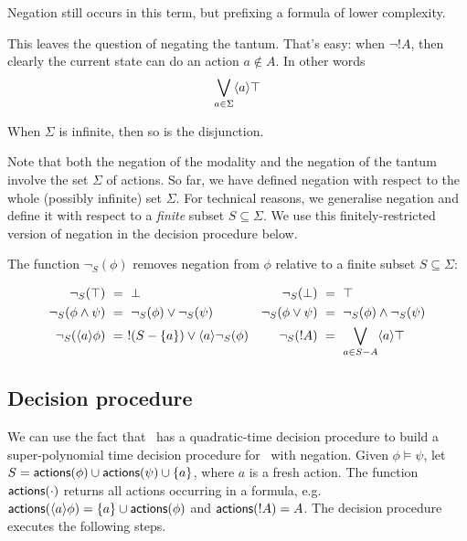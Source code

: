 \NI Negation still occurs in this term, but prefixing a formula of
lower complexity.

This leaves the question of negating the tantum. That's easy: when
$\neg !A$, then clearly the current state can do an action $a \notin
A$. In other words
\[
   \bigvee_{a \in \Sigma}\langle a \rangle \top
\]

\NI When $\Sigma$ is infinite, then so is the disjunction.

Note that both the negation of the modality and the negation of
the tantum involve the set $\Sigma$ of actions. 
So far, we have defined negation with respect to
the whole (possibly infinite) set $\Sigma$. For technical reasons, we
generalise negation and define it with respect to a \emph{finite}
subset $S \subseteq \Sigma$. We use this finitely-restricted version of
negation in the decision procedure below.

\begin{definition}
The function $\neg_{S}(\phi)$ removes negation from $\phi$
relative to a finite subset $S \subseteq \Sigma$:

\begin{align*}
  \neg_{S}(\top) &\ =\  \bot  &
  \neg_S(\bot) &\ =\  \top  \\
  \neg_S(\phi \land \psi) &\ =\  \neg_S(\phi) \lor \neg_S(\psi)  &
  \neg_S(\phi \lor \psi) &\ =\  \neg_S(\phi) \land \neg_S(\psi)  \\
  \neg_S(\langle a \rangle \phi) &\ =\  !(S-\{a\}) \lor \langle a \rangle \neg_S(\phi)  &
  \neg_S(! A) &\ =\  \bigvee_{a \in S - A} \langle a \rangle \top
\end{align*}


\end{definition}

\subsection{Decision procedure}

\NI We can use the fact that \cathoristic\ has a quadratic-time
decision procedure to build a super-polynomial time decision procedure for
\cathoristic\ with negation.  Given $\phi \models \psi$, let $S =
\mathsf{actions}(\phi) \cup \mathsf{actions}(\psi) \cup \{a\}$,   where $a$ is a
fresh action.  The function $\mathsf{actions}(\cdot)$ returns all actions
occurring in a formula, e.g. $\mathsf{actions}(\langle a \rangle \phi) = \{a\} \cup
\mathsf{actions}(\phi)$ and $\mathsf{actions}(!A) = A$. The decision procedure executes the following steps.

